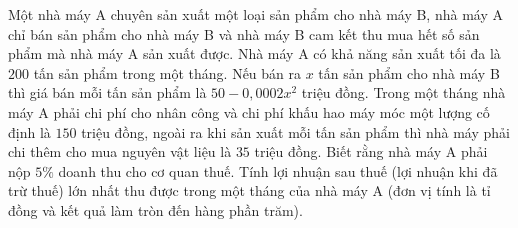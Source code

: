 \begin{ex}%
	Một nhà máy A chuyên sản xuất một loại sản phẩm cho nhà máy B, nhà máy A chỉ bán sản phẩm cho nhà máy B và nhà máy B cam kết thu mua hết số sản phẩm mà nhà máy A sản xuất được. Nhà máy A có khả năng sản xuất tối đa là $200$ tấn sản phẩm trong một tháng. Nếu bán ra $x$ tấn sản phẩm cho nhà máy B thì giá bán mỗi tấn sản phẩm là $50-0{,}0002x^2$ triệu đồng. Trong một tháng nhà máy A phải chi phí cho nhân công và chi phí khấu hao máy móc một lượng cố định là $150$ triệu đồng, ngoài ra khi sản xuất mỗi tấn sản phẩm thì nhà máy phải chi thêm cho mua nguyên vật liệu là $35$ triệu đồng. Biết rằng nhà máy A phải nộp $5\%$ doanh thu cho cơ quan thuế. Tính lợi nhuận sau thuế (lợi nhuận khi đã trừ thuế) lớn nhất thu được trong một tháng của nhà máy A (đơn vị tính là tỉ đồng và kết quả làm tròn đến hàng phần trăm).\\
	\par  {}
\end{ex}

